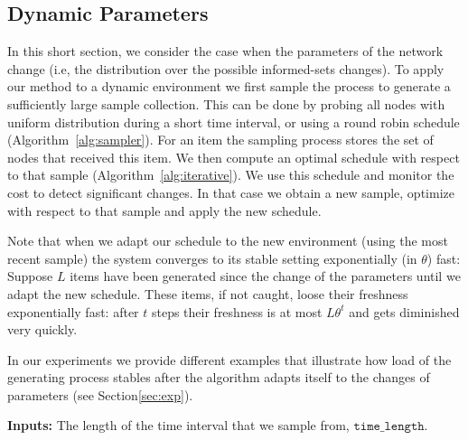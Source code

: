 \subsection{Dynamic Parameters}\label{sec:dynamic}
In this short section, we consider the case when the parameters of the network change (i.e, the distribution over the possible informed-sets changes).  To apply our method to a dynamic environment we first sample the process to generate a sufficiently large sample collection. This can be done by probing
 all nodes with uniform distribution during a short time interval, or using a round robin schedule (Algorithm~\ref{alg:sampler}). For an item the sampling process stores the set of nodes that received this item. We then compute an optimal schedule with respect to that sample (Algorithm~\ref{alg:iterative}). We use this schedule and monitor the cost to detect significant changes. In that case we obtain a new sample, optimize with respect to that sample and apply the new schedule. 
 
 Note that when we adapt our schedule to the new environment (using the most recent sample) the system converges to its stable setting exponentially (in $\theta$) fast: Suppose $L$ items have been generated since the change of the parameters until we adapt the new schedule. These items, if not caught, loose their freshness exponentially fast: after $t$ steps their freshness is at most $L\theta^t$ and gets diminished very quickly. 
 
 In our experiments we provide different examples that illustrate how load of the generating process stables after the algorithm adapts itself to the changes of parameters (see Section\ref{sec:exp}).
 
   
\begin{algorithm}[!h]
\BlankLine
{\bf Inputs:} The length of the time interval that we sample from, $\texttt{time\_length}$.


\caption{$\sampler(\texttt{time\_length})$}\label{alg:sampler}
\end{algorithm}  
   
